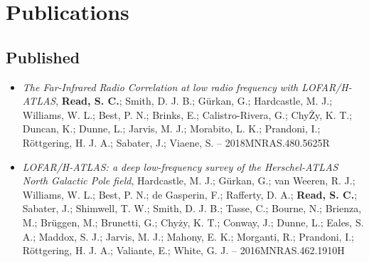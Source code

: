 \documentclass[letterpaper]{twentysecondcv} %
\begin{document}
\newpage
{}
\section{Publications}
\subsection{Published}
\begin{itemize}
     \item \textit{The Far-Infrared Radio Correlation at low radio frequency with
LOFAR/H-ATLAS}, \textbf{Read, S. C.}; Smith, D. J. B.; Gürkan, G.; Hardcastle, M. J.;
Williams, W. L.; Best, P. N.; Brinks, E.; Calistro-Rivera, G.; ChyŻy, K.
T.; Duncan, K.; Dunne, L.; Jarvis, M. J.; Morabito, L. K.; Prandoni, I.;
Röttgering, H. J. A.; Sabater, J.; Viaene, S. -- 2018MNRAS.480.5625R\\
 \item \textit{LOFAR/H-ATLAS: a deep low-frequency survey of the Herschel-ATLAS North
Galactic Pole field}, Hardcastle, M. J.; Gürkan, G.; van Weeren, R. J.; Williams, W. L.; Best,
P. N.; de Gasperin, F.; Rafferty, D. A.; \textbf{Read, S. C.}; Sabater,
J.; Shimwell, T. W.; Smith, D. J. B.; Tasse, C.; Bourne, N.; Brienza,
M.; Brüggen, M.; Brunetti, G.; Chyży, K. T.; Conway, J.; Dunne, L.;
Eales, S. A.; Maddox, S. J.; Jarvis, M. J.; Mahony, E. K.; Morganti, R.;
Prandoni, I.; Röttgering, H. J. A.; Valiante, E.; White, G. J. -- 2016MNRAS.462.1910H\\
\end{itemize}
\end{document}
